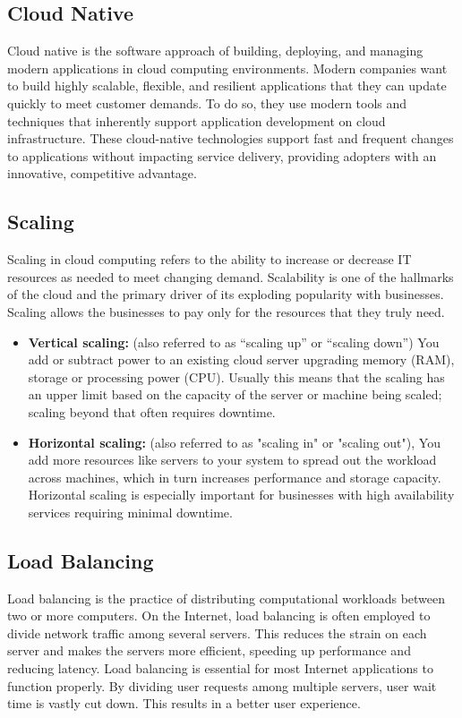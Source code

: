 	\subsection{Cloud Native}
		Cloud native \cite{cloudnative} is the software approach of building, deploying, and managing modern applications 
		in cloud computing environments. Modern companies want to build highly scalable, flexible, and 
		resilient applications that they can update quickly to meet customer demands. 
		To do so, they use modern tools and techniques that inherently support application
		development on cloud infrastructure. These cloud-native technologies support fast 
		and frequent changes to applications without impacting service delivery, providing
		adopters with an innovative, competitive advantage.

	\subsection{Scaling}
		Scaling \cite{scaling} in cloud computing refers to the ability to increase or decrease IT resources as
		needed to meet changing demand. Scalability is one of the hallmarks of the cloud and the primary driver 
		of its exploding popularity with businesses. Scaling allows the businesses to pay only for the resources that
		they truly need.
		\begin{itemize}
			\item \textbf{Vertical scaling:} (also referred to as “scaling up” or “scaling down”) 
			You add or subtract power to an existing cloud server upgrading memory (RAM),
			storage or processing power (CPU).
			Usually this means that the scaling has an upper limit based on the capacity of the server
			or machine being scaled; scaling beyond that often requires downtime.
			\item \textbf{Horizontal scaling:} (also referred to as "scaling in" or "scaling out"), 
			You add more resources like servers to your system to spread out the workload across machines, 
			which in turn increases performance and storage capacity. 
			Horizontal scaling is especially important for businesses with high availability services requiring 
			minimal downtime.
		\end{itemize}

	\subsection{Load Balancing}
		Load balancing \cite{loadbalancing} is the practice of distributing computational workloads between two or more computers. 
		On the Internet, load balancing is often employed to divide network traffic among several servers. 
		This reduces the strain on each server and makes the servers more efficient, speeding up performance and 
		reducing latency. Load balancing is essential for most Internet applications to function properly. 
		By dividing user requests among multiple servers, user wait time is vastly cut down. 
		This results in a better user experience.

